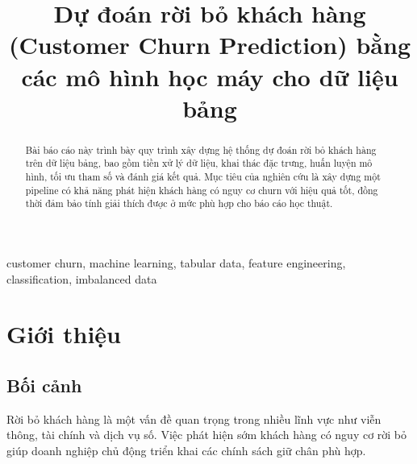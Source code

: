 \documentclass[conference]{IEEEtran}
\begin{document}
\title{Dự đoán rời bỏ khách hàng (Customer Churn Prediction) bằng các mô hình học máy cho dữ liệu bảng}

\author{
\and
{}
\and
{}
}

\maketitle

\begin{abstract}
Bài báo cáo này trình bày quy trình xây dựng hệ thống dự đoán rời bỏ khách hàng trên dữ liệu bảng, bao gồm tiền xử lý dữ liệu, khai thác đặc trưng, huấn luyện mô hình, tối ưu tham số và đánh giá kết quả. Mục tiêu của nghiên cứu là xây dựng một pipeline có khả năng phát hiện khách hàng có nguy cơ churn với hiệu quả tốt, đồng thời đảm bảo tính giải thích được ở mức phù hợp cho báo cáo học thuật.
\end{abstract}

\begin{IEEEkeywords}
customer churn, machine learning, tabular data, feature engineering, classification, imbalanced data
\end{IEEEkeywords}

\section{Giới thiệu}
\subsection{Bối cảnh}
Rời bỏ khách hàng là một vấn đề quan trọng trong nhiều lĩnh vực như viễn thông, tài chính và dịch vụ số. Việc phát hiện sớm khách hàng có nguy cơ rời bỏ giúp doanh nghiệp chủ động triển khai các chính sách giữ chân phù hợp.
\end{document}
